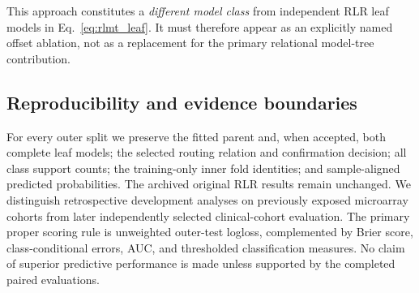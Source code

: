 This approach constitutes a \emph{different model class}
from independent RLR leaf models in
Eq.~\eqref{eq:rlmt_leaf}. It must therefore appear as
an explicitly named offset ablation, not as a replacement
for the primary relational model-tree contribution.

\subsection{Reproducibility and evidence boundaries}
\label{sec:rlmt_evidence}

For every outer split we preserve the fitted parent
and, when accepted, both complete leaf models; the selected
routing relation and confirmation decision; all class
support counts; the training-only inner fold identities;
and sample-aligned predicted probabilities. The archived
original RLR results remain unchanged. We distinguish
retrospective development analyses on previously exposed
microarray cohorts from later independently selected
clinical-cohort evaluation. The primary proper scoring
rule is unweighted outer-test logloss, complemented by
Brier score, class-conditional errors, AUC, and
thresholded classification measures. No claim of superior
predictive performance is made unless supported by the
completed paired evaluations.
